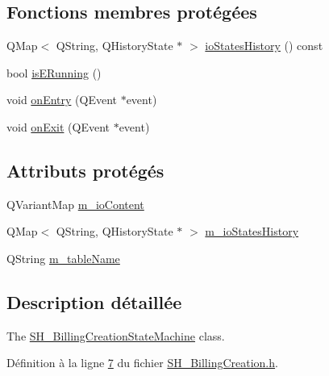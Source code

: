 \subsection*{Fonctions membres protégées}
\begin{DoxyCompactItemize}
\item 
Q\-Map$<$ Q\-String, Q\-History\-State $\ast$ $>$ \hyperlink{classSH__InOutStateMachine_a13889998c6dcd17db984dd6ed1454e80}{io\-States\-History} () const 
\item 
bool \hyperlink{classSH__InOutStateMachine_ae6c7448fbe267b035017108a9ffdff2e}{is\-E\-Running} ()
\item 
void \hyperlink{classSH__GenericStateMachine_adfd82f2532595ed7c4bcf21f03cbb951}{on\-Entry} (Q\-Event $\ast$event)
\item 
void \hyperlink{classSH__GenericStateMachine_a4b36d60fa1876908493d3d07f191a30f}{on\-Exit} (Q\-Event $\ast$event)
\end{DoxyCompactItemize}
\subsection*{Attributs protégés}
\begin{DoxyCompactItemize}
\item 
Q\-Variant\-Map \hyperlink{classSH__InOutStateMachine_a8cfbc27eef057bf37b7711bdfef2077e}{m\-\_\-io\-Content}
\item 
Q\-Map$<$ Q\-String, Q\-History\-State $\ast$ $>$ \hyperlink{classSH__InOutStateMachine_ac46ad1af230e1b2156d805275690dec3}{m\-\_\-io\-States\-History}
\item 
Q\-String \hyperlink{classSH__InOutStateMachine_aa009eecc5ab6181358faafb5996b6006}{m\-\_\-table\-Name}
\end{DoxyCompactItemize}


\subsection{Description détaillée}
The \hyperlink{classSH__BillingCreationStateMachine}{S\-H\-\_\-\-Billing\-Creation\-State\-Machine} class. 

Définition à la ligne \hyperlink{SH__BillingCreation_8h_source_l00007}{7} du fichier \hyperlink{SH__BillingCreation_8h_source}{S\-H\-\_\-\-Billing\-Creation.\-h}.



